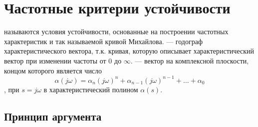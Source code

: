 \documentclass[../../TAU.tex]{subfiles}
\begin{document}
\section{Частотные критерии устойчивости}

     называются условия устойчивости, основанные на построении частотных характеристик и так называемой кривой Михайлова.
     --- годограф характеристического вектора, т.к. кривая, которую описывает характеристический вектор при изменении частоты от $0$ до $\infty$.
     --- вектор на комплексной плоскости, концом которого является число 
    $$\alpha(j \omega)=\alpha_n(j \omega)^n+\alpha_{n-1}(j \omega)^{n-1}+\dots+\alpha_0$$, при $s=j \omega$ в характеристический полином $\alpha(s)$.

\subsection{Принцип аргумента}
\end{document}
